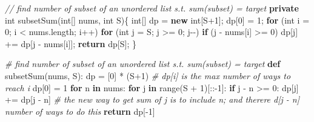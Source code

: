 \documentclass[
]{article}
\newenvironment{Shaded}{}{}
\newcommand{\BuiltInTok}[1]{#1}
\newcommand{\CommentTok}[1]{\textcolor[rgb]{0.38,0.63,0.69}{\textit{#1}}}
\newcommand{\ControlFlowTok}[1]{\textcolor[rgb]{0.00,0.44,0.13}{\textbf{#1}}}
\newcommand{\DataTypeTok}[1]{\textcolor[rgb]{0.56,0.13,0.00}{#1}}
\newcommand{\DecValTok}[1]{\textcolor[rgb]{0.25,0.63,0.44}{#1}}
\newcommand{\FunctionTok}[1]{\textcolor[rgb]{0.02,0.16,0.49}{#1}}
\newcommand{\KeywordTok}[1]{\textcolor[rgb]{0.00,0.44,0.13}{\textbf{#1}}}
\newcommand{\NormalTok}[1]{#1}
\newcommand{\OperatorTok}[1]{\textcolor[rgb]{0.40,0.40,0.40}{#1}}
\begin{document}
\begin{Shaded}
\begin{Highlighting}[]
\CommentTok{// find number of subset of an unordered list s.t. sum(subset) = target}
\KeywordTok{private} \DataTypeTok{int} \FunctionTok{subsetSum}\OperatorTok{(}\DataTypeTok{int}\OperatorTok{[]}\NormalTok{ nums}\OperatorTok{,} \DataTypeTok{int}\NormalTok{ S}\OperatorTok{)\{}
    \DataTypeTok{int}\OperatorTok{[]}\NormalTok{ dp }\OperatorTok{=} \KeywordTok{new} \DataTypeTok{int}\OperatorTok{[}\NormalTok{S}\OperatorTok{+}\DecValTok{1}\OperatorTok{];}
\NormalTok{    dp}\OperatorTok{[}\DecValTok{0}\OperatorTok{]} \OperatorTok{=} \DecValTok{1}\OperatorTok{;}
    \ControlFlowTok{for} \OperatorTok{(}\DataTypeTok{int}\NormalTok{ i }\OperatorTok{=} \DecValTok{0}\OperatorTok{;}\NormalTok{ i }\OperatorTok{\textless{}}\NormalTok{ nums}\OperatorTok{.}\FunctionTok{length}\OperatorTok{;}\NormalTok{ i}\OperatorTok{++)}
        \ControlFlowTok{for} \OperatorTok{(}\DataTypeTok{int}\NormalTok{ j }\OperatorTok{=}\NormalTok{ S}\OperatorTok{;}\NormalTok{ j }\OperatorTok{\textgreater{}=} \DecValTok{0}\OperatorTok{;}\NormalTok{ j}\OperatorTok{{-}{-})}
            \ControlFlowTok{if} \OperatorTok{(}\NormalTok{j }\OperatorTok{{-}}\NormalTok{ nums}\OperatorTok{[}\NormalTok{i}\OperatorTok{]} \OperatorTok{\textgreater{}=} \DecValTok{0}\OperatorTok{)}\NormalTok{ dp}\OperatorTok{[}\NormalTok{j}\OperatorTok{]} \OperatorTok{+=}\NormalTok{ dp}\OperatorTok{[}\NormalTok{j }\OperatorTok{{-}}\NormalTok{ nums}\OperatorTok{[}\NormalTok{i}\OperatorTok{]];}
    \ControlFlowTok{return}\NormalTok{ dp}\OperatorTok{[}\NormalTok{S}\OperatorTok{];}
\OperatorTok{\}}
\end{Highlighting}
\end{Shaded}

\begin{Shaded}
\begin{Highlighting}[]
\CommentTok{\# find number of subset of an unordered list s.t. sum(subset) = target}
\KeywordTok{def}\NormalTok{ subsetSum(nums, S):}
\NormalTok{    dp }\OperatorTok{=}\NormalTok{ [}\DecValTok{0}\NormalTok{] }\OperatorTok{*}\NormalTok{ (S}\OperatorTok{+}\DecValTok{1}\NormalTok{)  }\CommentTok{\# dp[i] is the max number of ways to reach i}
\NormalTok{    dp[}\DecValTok{0}\NormalTok{] }\OperatorTok{=} \DecValTok{1}
    \ControlFlowTok{for}\NormalTok{ n }\KeywordTok{in}\NormalTok{ nums:}
        \ControlFlowTok{for}\NormalTok{ j }\KeywordTok{in} \BuiltInTok{range}\NormalTok{(S }\OperatorTok{+} \DecValTok{1}\NormalTok{)[::}\OperatorTok{{-}}\DecValTok{1}\NormalTok{]:}
            \ControlFlowTok{if}\NormalTok{ j }\OperatorTok{{-}}\NormalTok{ n }\OperatorTok{\textgreater{}=} \DecValTok{0}\NormalTok{:}
\NormalTok{                dp[j] }\OperatorTok{+=}\NormalTok{ dp[j }\OperatorTok{{-}}\NormalTok{ n]  }\CommentTok{\# the new way to get sum of j is to include n; and there\textquotesingle{}re d[j {-} n] number of ways to do this}
    \ControlFlowTok{return}\NormalTok{ dp[}\OperatorTok{{-}}\DecValTok{1}\NormalTok{]}
\end{Highlighting}
\end{Shaded}
\end{document}
